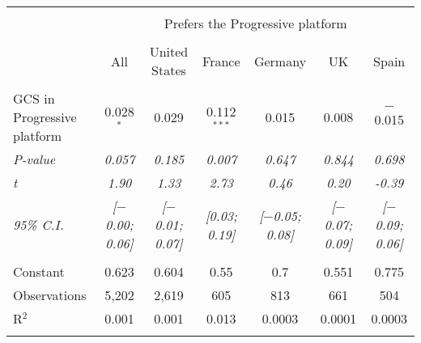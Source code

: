 
\begin{tabular}{@{\extracolsep{5pt}}lcccccc} 
\\[-1.8ex]\hline 
\hline \\[-1.8ex] 
 & \multicolumn{6}{c}{Prefers the Progressive platform} \\ 
\cline{2-7} 
\\[-1.8ex] & All & United States & France & Germany & UK & Spain \\ 
\hline \\[-1.8ex] 
 GCS in Progressive platform & 0.028$^{*}$ & 0.029 & 0.112$^{***}$ & 0.015 & 0.008 & $-$0.015 \\ 
 \textit{P-value} & \textit{0.057} & \textit{0.185} & \textit{0.007} & \textit{0.647} & \textit{0.844} & \textit{0.698} \\
 \textit{t} & \textit{1.90} & \textit{1.33} & \textit{2.73} & \textit{0.46} & \textit{0.20} & \textit{-0.39} \\
 \textit{95\% C.I.} & \textit{[$-$0.00; 0.06]} & \textit{[$-$0.01; 0.07]} & \textit{[0.03; 0.19]} & \textit{[$-$0.05; 0.08]} & \textit{[$-$0.07; 0.09]} & \textit{[$-$0.09; 0.06]} \\ 
 \hline \\[-1.8ex] 
Constant & 0.623 & 0.604 & 0.55 & 0.7 & 0.551 & 0.775 \\ 
Observations & 5,202 & 2,619 & 605 & 813 & 661 & 504 \\ 
R$^{2}$ & 0.001 & 0.001 & 0.013 & 0.0003 & 0.0001 & 0.0003 \\ 
\hline 
\hline \\[-1.8ex] 
\end{tabular} 